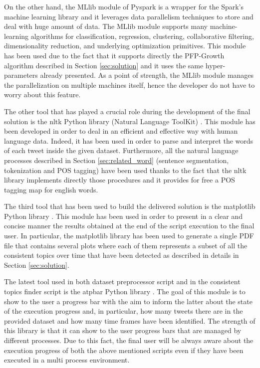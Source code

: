 \noindent On the other hand, the MLlib module of Pyspark is a wrapper for the Spark's machine learning library and it leverages data parallelism techniques to store and deal with huge amount of data. The MLlib module supports many machine-learning algorithms for classification, regression, clustering, collaborative filtering, dimensionality reduction, and underlying optimization primitives. This module has been used due to the fact that it supports directly the PFP-Growth algorithm described in Section \ref{sec:solution} and it uses the same hyper-parameters already presented. As a point of strength, the MLlib module manages the parallelization on multiple machines itself, hence the developer do not have to worry about this feature.

The other tool that has played a crucial role during the development of the final solution is the nltk Python library (Natural Language ToolKit) \cite{python-nltk}. This module has been developed in order to deal in an efficient and effective way with human language data. Indeed, it has been used in order to parse and interpret the words of each tweet inside the given dataset. Furthermore, all the natural language processes described in Section \ref{sec:related_word} (sentence segmentation, tokenization and POS tagging) have been used thanks to the fact that the nltk library implements directly those procedures and it provides for free a POS tagging map for english words.

The third tool that has been used to build the delivered solution is the matplotlib Python library \cite{matplotlib-python}. This module has been used in order to present in a clear and concise manner the results obtained at the end of the script execution to the final user. In particular, the matplotlib library has been used to generate a single PDF file that contains several plots where each of them represents a subset of all the consistent topics over time that have been detected as described in details in Section \ref{sec:solution}.

The latest tool used in both dataset preprocessor script and in the consistent topics finder script is the atpbar Python library \cite{atpbar-reference}. The goal of this module is to show to the user a progress bar with the aim to inform the latter about the state of the execution progress and, in particular, how many tweets there are in the provided dataset and how many time frames have been identified. The strength of this library is that it can show to the user progress bars that are managed by different processes. Due to this fact, the final user will be always aware about the execution progress of both the above mentioned scripts even if they have been executed in a multi process environment.

